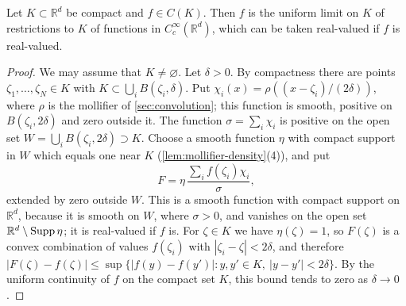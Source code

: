 \begin{lemma}\label{lem:compact-smooth-approximation}
Let $K\subset\mathbb R^d$ be compact and $f\in C(K)$. Then $f$ is the uniform limit on $K$ of restrictions to $K$ of functions in $C_c^\infty(\mathbb R^d)$, which can be taken real-valued if $f$ is real-valued.
\end{lemma}
\begin{proof}
We may assume that $K\neq\varnothing$. Let $\delta>0$. By compactness there are points $\zeta_1,\ldots,\zeta_N\in K$ with $K\subset\bigcup_iB(\zeta_i,\delta)$. Put $\chi_i(x)=\rho((x-\zeta_i)/(2\delta))$, where $\rho$ is the mollifier of \cref{sec:convolution}; this function is smooth, positive on $B(\zeta_i,2\delta)$ and zero outside it. The function $\sigma=\sum_i\chi_i$ is positive on the open set $W=\bigcup_iB(\zeta_i,2\delta)\supset K$. Choose a smooth function $\eta$ with compact support in $W$ which equals one near $K$ (\cref{lem:mollifier-density}(4)), and put
\[
 F=\eta\,\frac{\sum_if(\zeta_i)\chi_i}{\sigma},
\]
extended by zero outside $W$. This is a smooth function with compact support on $\mathbb R^d$, because it is smooth on $W$, where $\sigma>0$, and vanishes on the open set $\mathbb R^d\setminus\operatorname{Supp}\eta$; it is real-valued if $f$ is. For $\zeta\in K$ we have $\eta(\zeta)=1$, so $F(\zeta)$ is a convex combination of values $f(\zeta_i)$ with $|\zeta_i-\zeta|<2\delta$, and therefore $|F(\zeta)-f(\zeta)|\leq\sup\{|f(y)-f(y')|:y,y'\in K,\ |y-y'|<2\delta\}$. By the uniform continuity of $f$ on the compact set $K$, this bound tends to zero as $\delta\to0$.
\end{proof}

